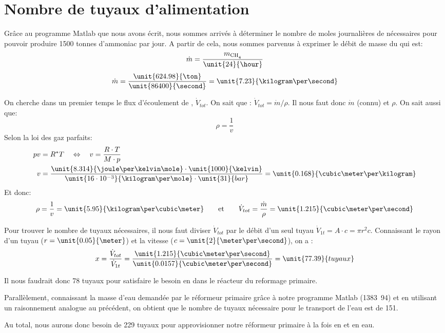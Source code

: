 \section{Nombre de tuyaux d'alimentation}

Grâce au programme Matlab que nous avons écrit, nous sommes arrivés à déterminer le nombre de moles journalières de  nécessaires pour pouvoir produire 1500 tonnes d'ammoniac par jour. A partir de cela, nous sommes parvenus à exprimer le débit de masse du  qui est:
    $$\dot{m}=\frac{m_{\ce{CH4}}}{\unit{24}{\hour}}$$
    $$\dot{m}=\frac{\unit{624.98}{\ton}}{\unit{86400}{\second}}=\unit{7.23}{\kilogram\per\second}$$

On cherche dans un premier temps le flux d'écoulement de , $\dot{V}_{tot}$. On sait que :
$\dot{V}_{tot}={\dot{m}}/{\rho}$.
Il nous faut donc $\dot{m}$ (connu) et $\rho$. On sait aussi que:
\[ \rho = \frac{1}{v} \]
Selon la loi des gaz parfaits:
\begin{align*}
    pv &= R^{*}T \quad\Leftrightarrow\quad v = \frac{R\cdot T}{M\cdot p} \\
    v &= \frac{\unit{8.314}{\joule\per\kelvin\mole}\cdot\unit{1000}{\kelvin}}{\unit{16\cdot10^{-3}}{\kilogram\per\mole}\cdot\unit{31}{bar}}=\unit{0.168}{\cubic\meter\per\kilogram}
\end{align*}
Et donc:
\[
    \rho = \frac{1}{v} = \unit{5.95}{\kilogram\per\cubic\meter}
    \qquad\text{et}\qquad
    \dot{V}_{tot} = \frac{\dot{m}}{\rho}=\unit{1.215}{\cubic\meter\per\second}
\]

Pour trouver le nombre de tuyaux nécessaires, il nous faut diviser $\dot{V}_{tot}$ par le débit d'un seul tuyau $\dot{V}_{1t} = A\cdot c = \pi r^2 c$. Connaissant le rayon d'un tuyau ($r=\unit{0.05}{\meter}$) et la vitesse ($c=\unit{2}{\meter\per\second}$), on a :
\[
    x = \frac{\dot{V}_{tot}}{\dot{V}_{1t}}
      = \frac{\unit{1.215}{\cubic\meter\per\second}}{\unit{0.0157}{\cubic\meter\per\second}}
      = \unit{77.39}{tuyaux}
\]

Il nous faudrait donc 78 tuyaux pour satisfaire le besoin en  dans le réacteur du reformage primaire.

Parallèlement, connaissant la masse d'eau demandée par le réformeur primaire grâce à notre programme Matlab (\unit{1383.94}{\ton}) et en utilisant un raisonnement analogue au précédent\footnotemark, on obtient que le nombre de tuyaux nécessaire pour le transport de l'eau est de 151.

Au total, nous aurons donc besoin de 229 tuyaux pour approvisionner notre réformeur primaire à la fois en  et en eau.
